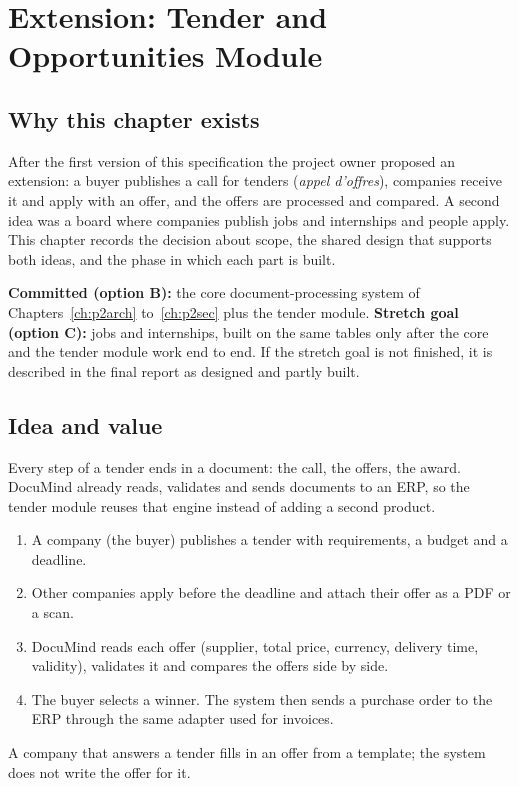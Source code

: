 \documentclass[11pt,a4paper]{report}
\begin{document}
\chapter{Extension: Tender and Opportunities Module}\label{ch:p2tender}
\section{Why this chapter exists}
After the first version of this specification the project owner proposed an extension: a buyer publishes a call for tenders (\emph{appel d'offres}), companies receive it and apply with an offer, and the offers are processed and compared. A second idea was a board where companies publish jobs and internships and people apply. This chapter records the decision about scope, the shared design that supports both ideas, and the phase in which each part is built.

\begin{infobox}
\textbf{Committed (option B):} the core document-processing system of Chapters~\ref{ch:p2arch} to~\ref{ch:p2sec} plus the tender module. \textbf{Stretch goal (option C):} jobs and internships, built on the same tables only after the core and the tender module work end to end. If the stretch goal is not finished, it is described in the final report as designed and partly built.
\end{infobox}

\section{Idea and value}
Every step of a tender ends in a document: the call, the offers, the award. DocuMind already reads, validates and sends documents to an ERP, so the tender module reuses that engine instead of adding a second product.
\begin{enumerate}
\item A company (the buyer) publishes a tender with requirements, a budget and a deadline.
\item Other companies apply before the deadline and attach their offer as a PDF or a scan.
\item DocuMind reads each offer (supplier, total price, currency, delivery time, validity), validates it and compares the offers side by side.
\item The buyer selects a winner. The system then sends a purchase order to the ERP through the same adapter used for invoices.
\end{enumerate}
A company that answers a tender fills in an offer from a template; the system does not write the offer for it.
\end{document}
